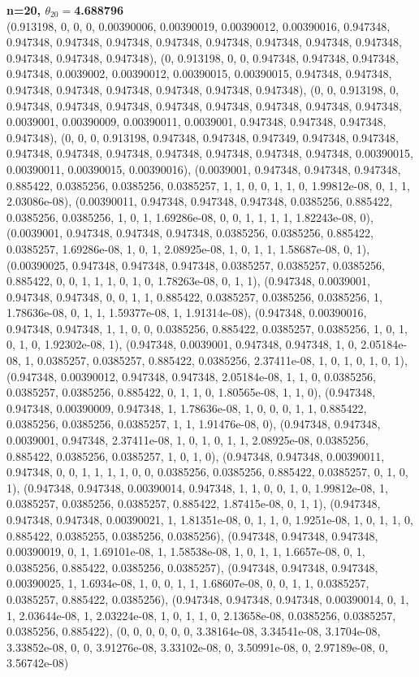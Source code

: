 \documentclass[12pt, a4paper]{extarticle}
\begin{document}
\begin{center}
{\bf\boldmath n=20, $\theta_{20}=$4.688796}\\
(0.913198, 0, 0, 0, 0.00390006, 0.00390019, 0.00390012, 0.00390016, 0.947348, 0.947348, 0.947348, 0.947348, 0.947348, 0.947348, 0.947348, 0.947348, 0.947348, 0.947348, 0.947348, 0.947348),
(0, 0.913198, 0, 0, 0.947348, 0.947348, 0.947348, 0.947348, 0.0039002, 0.00390012, 0.00390015, 0.00390015, 0.947348, 0.947348, 0.947348, 0.947348, 0.947348, 0.947348, 0.947348, 0.947348),
(0, 0, 0.913198, 0, 0.947348, 0.947348, 0.947348, 0.947348, 0.947348, 0.947348, 0.947348, 0.947348, 0.0039001, 0.00390009, 0.00390011, 0.0039001, 0.947348, 0.947348, 0.947348, 0.947348),
(0, 0, 0, 0.913198, 0.947348, 0.947348, 0.947349, 0.947348, 0.947348, 0.947348, 0.947348, 0.947348, 0.947348, 0.947348, 0.947348, 0.947348, 0.00390015, 0.00390011, 0.00390015, 0.00390016),
(0.0039001, 0.947348, 0.947348, 0.947348, 0.885422, 0.0385256, 0.0385256, 0.0385257, 1, 1, 0, 0, 1, 1, 0, 1.99812e-08, 0, 1, 1, 2.03086e-08),
(0.00390011, 0.947348, 0.947348, 0.947348, 0.0385256, 0.885422, 0.0385256, 0.0385256, 1, 0, 1, 1.69286e-08, 0, 0, 1, 1, 1, 1, 1.82243e-08, 0),
(0.0039001, 0.947348, 0.947348, 0.947348, 0.0385256, 0.0385256, 0.885422, 0.0385257, 1.69286e-08, 1, 0, 1, 2.08925e-08, 1, 0, 1, 1, 1.58687e-08, 0, 1),
(0.00390025, 0.947348, 0.947348, 0.947348, 0.0385257, 0.0385257, 0.0385256, 0.885422, 0, 0, 1, 1, 1, 0, 1, 0, 1.78263e-08, 0, 1, 1),
(0.947348, 0.0039001, 0.947348, 0.947348, 0, 0, 1, 1, 0.885422, 0.0385257, 0.0385256, 0.0385256, 1, 1.78636e-08, 0, 1, 1, 1.59377e-08, 1, 1.91314e-08),
(0.947348, 0.00390016, 0.947348, 0.947348, 1, 1, 0, 0, 0.0385256, 0.885422, 0.0385257, 0.0385256, 1, 0, 1, 0, 1, 0, 1.92302e-08, 1),
(0.947348, 0.0039001, 0.947348, 0.947348, 1, 0, 2.05184e-08, 1, 0.0385257, 0.0385257, 0.885422, 0.0385256, 2.37411e-08, 1, 0, 1, 0, 1, 0, 1),
(0.947348, 0.00390012, 0.947348, 0.947348, 2.05184e-08, 1, 1, 0, 0.0385256, 0.0385257, 0.0385256, 0.885422, 0, 1, 1, 0, 1.80565e-08, 1, 1, 0),
(0.947348, 0.947348, 0.00390009, 0.947348, 1, 1.78636e-08, 1, 0, 0, 0, 1, 1, 0.885422, 0.0385256, 0.0385256, 0.0385257, 1, 1, 1.91476e-08, 0),
(0.947348, 0.947348, 0.0039001, 0.947348, 2.37411e-08, 1, 0, 1, 0, 1, 1, 2.08925e-08, 0.0385256, 0.885422, 0.0385256, 0.0385257, 1, 0, 1, 0),
(0.947348, 0.947348, 0.00390011, 0.947348, 0, 0, 1, 1, 1, 1, 0, 0, 0.0385256, 0.0385256, 0.885422, 0.0385257, 0, 1, 0, 1),
(0.947348, 0.947348, 0.00390014, 0.947348, 1, 1, 0, 0, 1, 0, 1.99812e-08, 1, 0.0385257, 0.0385256, 0.0385257, 0.885422, 1.87415e-08, 0, 1, 1),
(0.947348, 0.947348, 0.947348, 0.00390021, 1, 1.81351e-08, 0, 1, 1, 0, 1.9251e-08, 1, 0, 1, 1, 0, 0.885422, 0.0385255, 0.0385256, 0.0385256),
(0.947348, 0.947348, 0.947348, 0.00390019, 0, 1, 1.69101e-08, 1, 1.58538e-08, 1, 0, 1, 1, 1.6657e-08, 0, 1, 0.0385256, 0.885422, 0.0385256, 0.0385257),
(0.947348, 0.947348, 0.947348, 0.00390025, 1, 1.6934e-08, 1, 0, 0, 1, 1, 1.68607e-08, 0, 0, 1, 1, 0.0385257, 0.0385257, 0.885422, 0.0385256),
(0.947348, 0.947348, 0.947348, 0.00390014, 0, 1, 1, 2.03644e-08, 1, 2.03224e-08, 1, 0, 1, 1, 0, 2.13658e-08, 0.0385256, 0.0385257, 0.0385256, 0.885422),
(0, 0, 0, 0, 0, 0, 3.38164e-08, 3.34541e-08, 3.1704e-08, 3.33852e-08, 0, 0, 3.91276e-08, 3.33102e-08, 0, 3.50991e-08, 0, 2.97189e-08, 0, 3.56742e-08)
\end{center}
\end{document}
